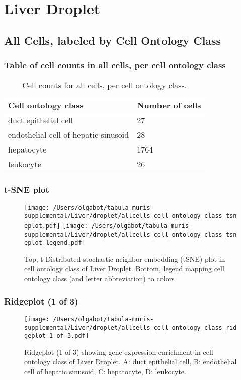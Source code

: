 \clearpage
\section{Liver Droplet}

\subsection{All Cells, labeled by Cell Ontology Class}
\subsubsection{Table of cell counts in all cells, per cell ontology class}\begin{table}[h]
\centering
\label{my-label}
\begin{tabular}{@{}ll@{}}
\toprule

Cell ontology class& Number of cells \\ \midrule
duct epithelial cell & 27 \\

endothelial cell of hepatic sinusoid & 28 \\

hepatocyte & 1764 \\

leukocyte & 26 \\
\bottomrule
\end{tabular}
\caption{Cell counts for all cells, per cell ontology class.}
\end{table}

\clearpage
\subsubsection{t-SNE plot}
\begin{figure}[h]
\centering
\texttt{[image: /Users/olgabot/tabula-muris-supplemental/Liver/droplet/allcells\_cell\_ontology\_class\_tsneplot.pdf]}
\texttt{[image: /Users/olgabot/tabula-muris-supplemental/Liver/droplet/allcells\_cell\_ontology\_class\_tsneplot\_legend.pdf]}
\caption{Top, t-Distributed stochastic neighbor embedding (tSNE) plot  in cell ontology class of Liver Droplet. Bottom, legend mapping cell ontology class (and letter abbreviation) to colors}
\end{figure}


\clearpage
\clearpage
\subsubsection{Ridgeplot (1 of 3)}
\begin{figure}[h]
\centering
\texttt{[image: /Users/olgabot/tabula-muris-supplemental/Liver/droplet/allcells\_cell\_ontology\_class\_ridgeplot\_1-of-3.pdf]}

\caption{ Ridgeplot (1 of 3)  showing gene expression enrichment in cell ontology class of Liver Droplet. A: duct epithelial cell, B: endothelial cell of hepatic sinusoid, C: hepatocyte, D: leukocyte.}
\end{figure}


